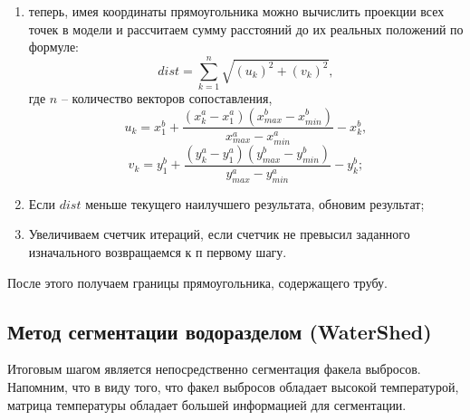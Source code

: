 \documentclass[14pt, a4paper]{extreport}
\begin{document}
\begin{enumerate}[label={\arabic*)}]
\begin{subequations}
			\begin{equation*}
				y^{b}_{1} = y^{b}_{min} - \frac{(y^{a}_{min} - y^{a}_{1})(y^{b}_{max} - y^{b}_{min})}{y^{a}_{max} - y^{a}_{min}},
			\end{equation*}
			\vspace*{-1.1cm}
			\begin{equation*}
				y^{b}_{2} = y^{b}_{max} + \frac{(y^{a}_{2} - y^{a}_{max})(y^{b}_{max} - y^{b}_{min})}{y^{a}_{max} - y^{a}_{min}};
			\end{equation*}
			\label{x,y,1,2}
			\vspace*{-0.8cm}
		\end{subequations}
		\item теперь, имея координаты прямоугольника можно вычислить проекции всех точек в модели и рассчитаем сумму расстояний до их реальных положений по формуле:
		\begin{equation}
			dist = \sum\limits_{k=1}^n \sqrt{(u_k)^2 + (v_k)^2},
			\label{dist}
		\end{equation}
		где $n$ -- количество векторов сопоставления, 
		\begin{equation*}
			u_k = x^{b}_{1} + \frac{(x^{a}_{k} - x^{a}_{1})(x^{b}_{max} - x^{b}_{min})}{x^{a}_{max} - x^{a}_{min}} - x^{b}_{k},
			\label{dist1dop}
		\end{equation*}
		\vspace*{-0.8cm}
		\begin{equation*}
			v_k = y^{b}_{1} + \frac{(y^{a}_{k} - y^{a}_{1})(y^{b}_{max} - y^{b}_{min})}{y^{a}_{max} - y^{a}_{min}} - y^{b}_{k};
			\label{dist2dop}
		\end{equation*}
		\item Если $dist$ меньше текущего наилучшего результата, обновим результат;
		\item Увеличиваем счетчик итераций, если счетчик не превысил заданного изначального возвращаемся к п первому шагу.
	\end{enumerate}

	После этого получаем границы прямоугольника, содержащего трубу.

\subsection{Метод сегментации водоразделом (WaterShed)}
	
	Итоговым шагом является непосредственно сегментация факела выбросов. Напомним, что в виду того, что факел выбросов обладает высокой температурой, матрица температуры обладает большей информацией для сегментации.
	
\end{document}
